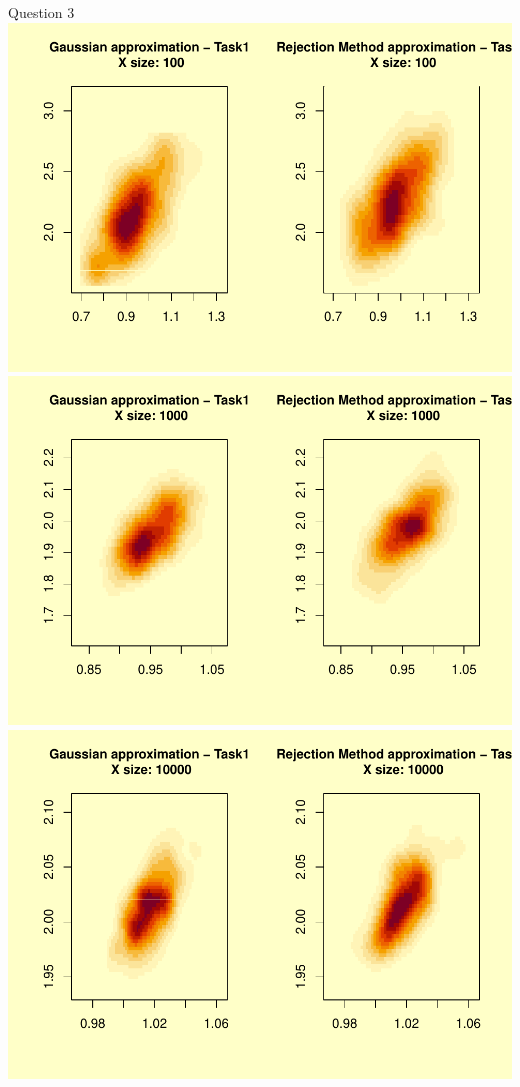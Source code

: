 \documentclass[
]{article}
\begin{document}
Question 3
\includegraphics{take_home_q1_q2_q3_files/figure-latex/unnamed-chunk-2-1.pdf}
\includegraphics{take_home_q1_q2_q3_files/figure-latex/unnamed-chunk-2-2.pdf}
\includegraphics{take_home_q1_q2_q3_files/figure-latex/unnamed-chunk-2-3.pdf}
\end{document}
